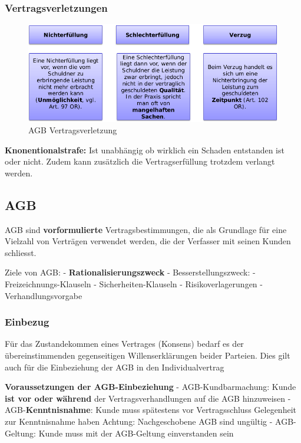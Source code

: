 \hypertarget{vertragsverletzungen}{%
\subsubsection{Vertragsverletzungen}\label{vertragsverletzungen}}

\begin{figure}
\centering
\includegraphics{figures/agbVertragsverletzungen.png}
\caption{AGB Vertragsverletzung}
\end{figure}

\textbf{Knonentionalstrafe:} Ist unabhängig ob wirklich ein Schaden
entstanden ist oder nicht. Zudem kann zusätzlich die Vertragserfüllung
trotzdem verlangt werden.

\hypertarget{agb}{%
\subsection{AGB}\label{agb}}

AGB sind \textbf{vorformulierte} Vertragsbestimmungen, die als Grundlage
für eine Vielzahl von Verträgen verwendet werden, die der Verfasser mit
seinen Kunden schliesst.

Ziele von AGB: - \textbf{Rationalisierungszweck} - Besserstellungszweck:
- Freizeichnungs-Klauseln - Sicherheiten-Klauseln - Risikoverlagerungen
- Verhandlungsvorgabe

\hypertarget{einbezug}{%
\subsubsection{Einbezug}\label{einbezug}}

Für das Zustandekommen eines Vertrages (Konsens) bedarf es der
übereinstimmenden gegenseitigen Willenserklärungen beider Parteien. Dies
gilt auch für die Einbeziehung der AGB in den Individualvertrag

\textbf{Voraussetzungen der AGB-Einbeziehung} - AGB-Kundbarmachung:
Kunde \textbf{ist vor oder während} der Vertragsverhandlungen auf die
AGB hinzuweisen - AGB-\textbf{Kenntnisnahme}: Kunde muss spätestens vor
Vertragsschluss Gelegenheit zur Kenntnisnahme haben Achtung:
Nachgeschobene AGB sind ungültig - AGB-Geltung: Kunde muss mit der
AGB-Geltung einverstanden sein

